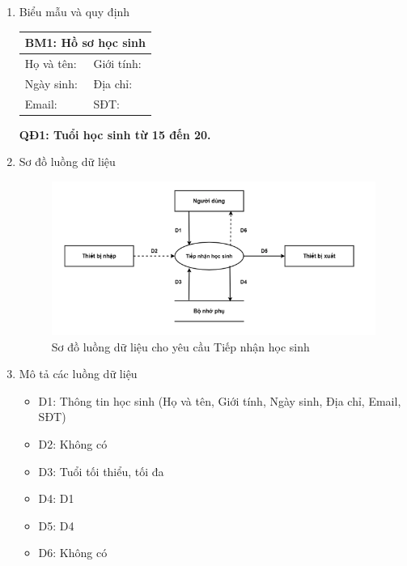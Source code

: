 \documentclass[a4paper]{article}
\begin{document}
\begin{enumerate}[label=\alph*.] 
\item Biểu mẫu và quy định
\begin{table}[H]
    \centering
    \renewcommand{\arraystretch}{1.5}
    \begin{tabular}{|p{5cm}<{\raggedright}|p{5cm}<{\raggedright}|} %
    \hline
    \multicolumn{2}{|c|}{ \textbf{BM1: Hồ sơ học sinh}} \\ %
    \hline
    Họ và tên: \dotfill & Giới tính: \dotfill \\ 
    \hline
    Ngày sinh: \dotfill & Địa chỉ: \dotfill \\ 
    \hline
    Email: \dotfill & SĐT: \dotfill \\ 
    \hline
    \end{tabular}
\end{table}
	
\textbf{QĐ1: Tuổi học sinh từ 15 đến 20.} 

\item Sơ đồ luồng dữ liệu
\begin{figure}[H] 
    \centering
    \includegraphics[width=1\textwidth]{dfd1} %
    \caption{Sơ đồ luồng dữ liệu cho yêu cầu Tiếp nhận học sinh}
\end{figure}


\item Mô tả các luồng dữ liệu
\begin{itemize}
\item D1: Thông tin học sinh (Họ và tên, Giới tính, Ngày sinh, Địa chỉ, Email, SĐT)
\item D2: Không có
\item D3: Tuổi tối thiểu, tối đa
\item D4: D1 
\item D5: D4
\item D6: Không có
\end{itemize}


\end{enumerate}
\end{document}

